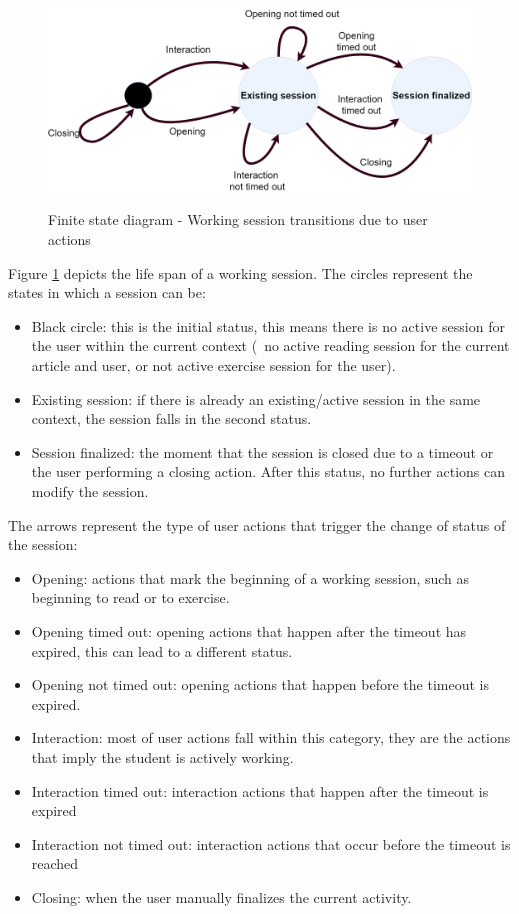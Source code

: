 \begin{figure}[bth]
	{\includegraphics[width=1\linewidth]{gfx/Finite_state_machine_diagramv3}} \quad
	\caption[Finite state diagram - Working session transitions due to user actions]{Finite state diagram - Working session transitions due to user actions}\label{fig:markov_diagram}
\end{figure}

Figure \ref{fig:markov_diagram} depicts the life span of a working session.
The circles represent the states in which a session can be:
\begin{itemize}
	\item Black circle: this is the initial status, this means there is no active session for the user within the current context (\Ie\ no active reading session for the current article and user, or not active exercise session for the user). 
	\item Existing session: if there is already an existing/active session in the same context, the session falls in the second status.
	\item Session finalized: the moment that the session is closed due to a timeout or the user performing a closing action. After this status, no further actions can modify the session.
\end{itemize}

The arrows represent the type of user actions that trigger the change of status of the session:
\begin{itemize}
	\item Opening: actions that mark the beginning of a working session, such as beginning to read or to exercise.
	\item Opening timed out: opening actions that happen after the timeout has expired, this can lead to a different status.
	\item Opening not timed out: opening actions that happen before the timeout is expired.
	\item Interaction: most of user actions fall within this category, they are the actions that imply the student is actively working.
	\item Interaction timed out: interaction actions that happen after the timeout is expired
	\item Interaction not timed out: interaction actions that occur before the timeout is reached
	\item Closing: when the user manually finalizes the current activity.
\end{itemize}


